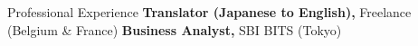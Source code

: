 \begin{rubric}{Professional Experience}
\entry*[2016/06 -- 2019/03]%
	\textbf{Translator (Japanese to English),} Freelance (Belgium \& France)
\entry*[2016/09 -- 2017/05]%
	\textbf{Business Analyst,} SBI BITS (Tokyo)
\end{rubric}
